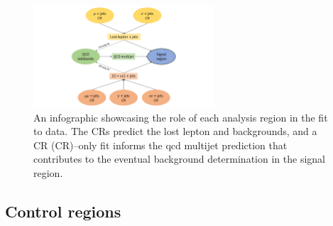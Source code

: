 \begin{figure}[htbp]
    \centering
    \includegraphics[width=0.6\textwidth]{figures/fit_overview.pdf}
    \caption[An infographic showcasing the role of each analysis region in the fit to data]{An infographic showcasing the role of each analysis region in the fit to data. The \glspl{CR} predict the lost lepton and \ztonunu backgrounds, and a \gls{CR} (CR)--only fit informs the \acrshort{qcd} multijet prediction that contributes to the eventual background determination in the signal region.}
    \label{fig:htoinv_fit_overview}
\end{figure}




\subsection{Control regions}
\label{subsec:htoinv_control_regions}

